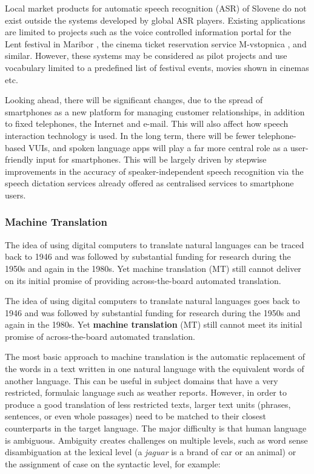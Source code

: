 \begin{multicols}{2}
Local market products for automatic speech recognition (ASR) of Slovene do not exist outside the systems developed by global ASR players. Existing applications are limited to projects such as the voice controlled information portal for the Lent festival in Maribor \cite{Lent1},  the cinema ticket reservation service M-vstopnica \cite{Kolosej1},  and similar. However, these systems may be considered as pilot projects and use vocabulary limited to a predefined list of festival events, movies shown in cinemas etc.

Looking ahead, there will be significant changes, due to the spread of smartphones as a new platform for managing customer relationships, in addition to fixed telephones, the Internet and e-mail. This will also affect how speech interaction technology is used. In the long term, there will be fewer telephone-based VUIs, and spoken language apps will play a far more central role as a user-friendly input for smartphones. This will be largely driven by stepwise improvements in the accuracy of speaker-independent speech recognition via the speech dictation services already offered as centralised services to smartphone users.

\subsubsection{Machine Translation}

The idea of using digital computers to translate natural languages can be traced back to 1946 and was followed by substantial funding for research during the 1950s and again in the 1980s. 
Yet machine translation (MT) still cannot deliver on its initial promise of providing across-the-board automated translation.  


The idea of using digital computers to translate natural languages goes back to 1946 and was followed by substantial funding for research during the 1950s and again in the 1980s. Yet \textbf{machine translation} (MT) still cannot meet its initial promise of across-the-board automated translation. 

The most basic approach to machine translation is the automatic replacement of the words in a text written in one natural language with the equivalent words of another language. This can be useful in subject domains that have a very restricted, formulaic language such as weather reports.
However, in order to produce a good translation of less restricted texts, larger text units (phrases, sentences, or even whole passages) need to be matched to their closest counterparts in the target language. The major difficulty is that human language is ambiguous. Ambiguity creates challenges on multiple levels, such as word sense disambiguation at the lexical level (a \textit{jaguar} is a brand of car or an animal) or the assignment of case on the syntactic level, for example:


\end{multicols}
